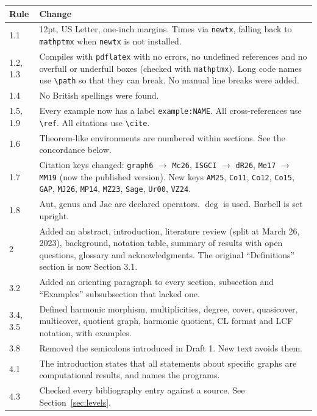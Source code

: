 \documentclass[11pt,letterpaper]{article}
\begin{document}
\begin{longtable}{p{}p{}}
\hline
Rule & Change \\
\hline
\endhead
1.1 & 12pt, US Letter, one-inch margins. Times via \texttt{newtx}, falling back to \texttt{mathptmx} when \texttt{newtx} is not installed. \\
1.2, 1.3 & Compiles with \texttt{pdflatex} with no errors, no undefined references and no overfull or underfull boxes (checked with \texttt{mathptmx}). Long code names use \verb|\path| so that they can break. No manual line breaks were added. \\
1.4 & No British spellings were found. \\
1.5, 1.9 & Every example now has a label \texttt{example:NAME}. All cross-references use \verb|\ref|. All citations use \verb|\cite|. \\
1.6 & Theorem-like environments are numbered within sections. See the concordance below. \\
1.7 & Citation keys changed: \texttt{graph6} $\to$ \texttt{Mc26}, \texttt{ISGCI} $\to$ \texttt{dR26}, \texttt{Me17} $\to$ \texttt{MM19} (now the published version). New keys \texttt{AM25}, \texttt{Co11}, \texttt{Co12}, \texttt{Co15}, \texttt{GAP}, \texttt{MJ26}, \texttt{MP14}, \texttt{MZ23}, \texttt{Sage}, \texttt{Ur00}, \texttt{VZ24}. \\
1.8 & $\mathrm{Aut}$, $\mathrm{genus}$ and $\mathrm{Jac}$ are declared operators. $\deg$ is used. Barbell is set upright. \\
2 & Added an abstract, introduction, literature review (split at March 26, 2023), background, notation table, summary of results with open questions, glossary and acknowledgments. The original ``Definitions'' section is now Section 3.1. \\
3.2 & Added an orienting paragraph to every section, subsection and ``Examples'' subsubsection that lacked one. \\
3.4, 3.5 & Defined harmonic morphism, multiplicities, degree, cover, quasicover, multicover, quotient graph, harmonic quotient, CL format and LCF notation, with examples. \\
3.8 & Removed the semicolons introduced in Draft 1. New text avoids them. \\
4.1 & The introduction states that all statements about specific graphs are computational results, and names the programs. \\
4.3 & Checked every bibliography entry against a source. See Section~\ref{sec:levels}. \\

\end{longtable}
\end{document}
